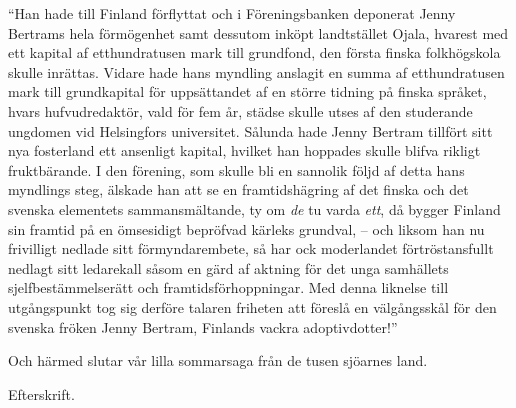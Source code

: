 ``Han hade till Finland förflyttat och i Föreningsbanken deponerat Jenny
Bertrams hela förmögenhet samt dessutom inköpt landtstället Ojala,
hvarest med ett kapital af etthundratusen mark till grundfond, den
första finska folkhögskola skulle inrättas. Vidare hade hans myndling
anslagit en summa af etthundratusen mark till grundkapital för
uppsättandet af en större tidning på finska språket, hvars
hufvudredaktör, vald för fem år, städse skulle utses af den studerande
ungdomen vid Helsingfors universitet. Sålunda hade Jenny Bertram
tillfört sitt nya fosterland ett ansenligt kapital, hvilket han hoppades
skulle blifva rikligt fruktbärande. I den förening, som skulle bli en
sannolik följd af detta hans myndlings steg, älskade han att se en
framtidshägring af det finska och det svenska elementets
sammansmältande, ty om \emph{de} tu varda \emph{ett}, då bygger Finland
sin framtid på en ömsesidigt bepröfvad kärleks grundval, -- och liksom
han nu frivilligt nedlade sitt förmyndarembete, så har ock moderlandet
förtröstansfullt nedlagt sitt ledarekall såsom en gärd af aktning för
det unga samhällets sjelfbestämmelserätt och framtidsförhoppningar. Med
denna liknelse till utgångspunkt tog sig derföre talaren friheten att
föreslå en välgångsskål för den svenska fröken Jenny Bertram, Finlands
vackra adoptivdotter!''

Och härmed slutar vår lilla sommarsaga från de tusen sjöarnes land.

Efterskrift.

